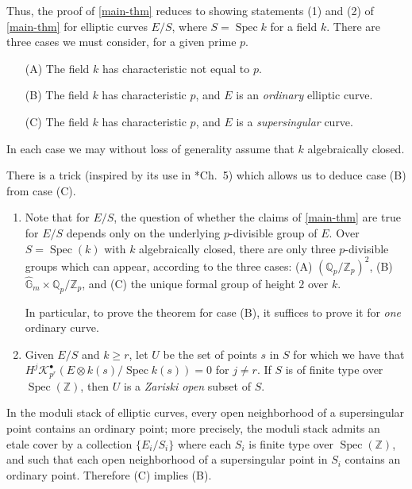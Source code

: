 \documentclass[11pt]{amsart}
\numberwithin{equation}{section}
\theoremstyle{plain}
\theoremstyle{remark}
\theoremstyle{plain}
\begin{document}
Thus, the proof of \eqref{main-thm} reduces to showing statements (1)
and (2) of \eqref{main-thm} for elliptic curves $E/S$, where $S={\operatorname{Spec}} k$
for a field $k$. 
There are three cases we must consider, for a given prime $p$.
\begin{enumerate}
\item [(A)]  The field $k$ has characteristic not equal to $p$.
\item [(B)]  The field $k$ has characteristic $p$, and $E$ is an
  \emph{ordinary} elliptic curve.
\item [(C)]  The field $k$ has characteristic $p$, and $E$ is a
  \emph{supersingular} curve.
\end{enumerate}
In each case we may without loss of generality assume that $k$
algebraically closed.

There is a trick (inspired by its use in \cite{katz-mazur}*{Ch.\ 5})
which allows 
us to deduce case (B) from case (C). 
\begin{enumerate}
\item Note that for $E/S$, the question of whether the claims of
  \eqref{main-thm} are true for $E/S$ depends only on the underlying
  $p$-divisible group of $E$.  Over $S={\operatorname{Spec}}(k)$ with $k$
  algebraically closed, there are only three $p$-divisible groups
  which can appear, according to the three cases: (A) $({\mathbb{Q}}_p/{\mathbb{Z}}_p)^2$,
  (B) $\widehat{\mathbb{G}}_m\times   {\mathbb{Q}}_p/{\mathbb{Z}}_p$, and (C) the unique
  formal group of height $2$ over $k$.  

  In particular, to prove the theorem for case (B), it suffices to prove it for
  \emph{one} ordinary curve.

\item Given $E/S$ and $k\geq r$, let $U$ be the set of points $s$ in
  $S$ for which we have  that $H^j{\mathscr{K}}^\bullet_{p^r}(E\otimes k(s)/{\operatorname{Spec}}
  k(s))=0$ for 
  $j\neq r$.  If $S$ is of finite type over ${\operatorname{Spec}}({\mathbb{Z}})$, then $U$ is a
  \emph{Zariski open} subset of $S$.   
\end{enumerate}
In the moduli stack of elliptic curves, every open neighborhood of a
supersingular point contains an ordinary point; more precisely, the
moduli stack admits an etale cover by a collection $\{E_i/S_i\}$ where
each $S_i$ is finite 
type over ${\operatorname{Spec}}({\mathbb{Z}})$, and such that each open neighborhood of a
supersingular point in $S_i$ contains an ordinary point.   Therefore
(C) implies 
(B).
\end{document}
